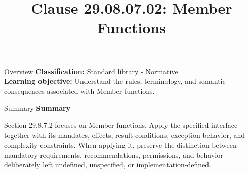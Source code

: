 \documentclass[10pt,letterpaper]{article}
\title{Clause 29.08.07.02: Member Functions}
\author{}
\date{}
\begin{document}
\maketitle
\begin{CornellOverviewBox}{Overview}
\textbf{Classification:} Standard library - Normative\\[2pt]
\textbf{Learning objective:} Understand the rules, terminology, and semantic consequences associated with Member functions.
\end{CornellOverviewBox}\begin{CornellSummaryBox}{Summary}
{\sffamily\bfseries\color{Accent} Summary}\par\vspace{3pt}Section 29.8.7.2 focuses on Member functions. Apply the specified interface together with its mandates, effects, result conditions, exception behavior, and complexity constraints. When applying it, preserve the distinction between mandatory requirements, recommendations, permissions, and behavior deliberately left undefined, unspecified, or implementation-defined.
\end{CornellSummaryBox}
\end{document}
